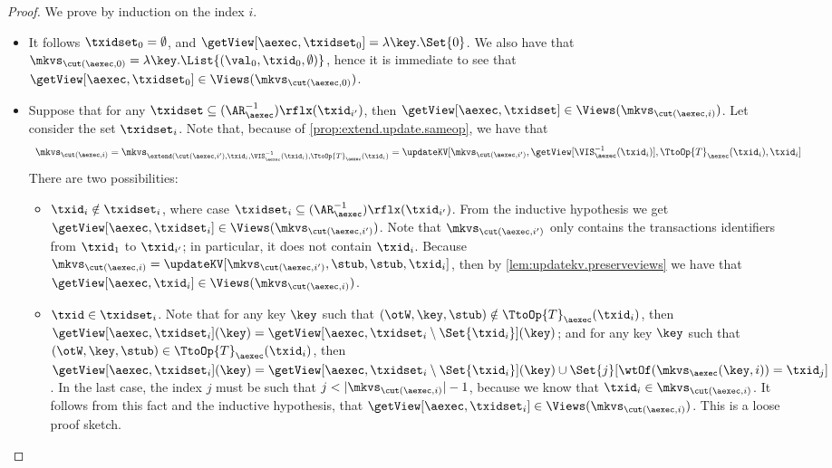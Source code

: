 \begin{proof}
We prove by induction on the index $i$. 
\begin{itemize}
\item {} It follows $\txidset_{0} = \emptyset$, and $\getView[\aexec, \txidset_{0}] = \lambda \key. \Set{0}$. 
We also have that $\mkvs_{\cut(\aexec, 0)} = \lambda \key. \List{(\val_0, \txid_{0}, \emptyset)}$, hence 
it is immediate to see that $\getView[\aexec, \txidset_{0}] \in \Views(\mkvs_{\cut(\aexec, 0)})$.

\item {}
Suppose that for any $\txidset \subseteq (\AR_{\aexec}^{-1})\rflx(\txid_{i'})$, 
then $\getView[\aexec, \txidset] \in \Views(\mkvs_{\cut(\aexec, i)})$. 
Let consider the set $\txidset_{i}$.
Note that, because of \cref{prop:extend.update.sameop}, we have that
\[
\begin{array}{l}
\mkvs_{\cut(\aexec, i)} =
\mkvs_{\extend(\cut(\aexec, i'), \txid_{i}, \VIS^{-1}_{\aexec}(\txid_{i}), \TtoOp{T}_{\aexec}(\txid_{i})} 
= \updateKV[\mkvs_{\cut(\aexec, i')}, \getView[\VIS^{-1}_{\aexec}(\txid_{i})], \TtoOp{T}_{\aexec}(\txid_{i}), \txid_{i}]
\end{array}
\]
There are two possibilities:
\begin{itemize}
\item $\txid_{i} \notin \txidset_{i}$, where case $\txidset_{i} \subseteq (\AR_{\aexec}^{-1})\rflx(\txid_{i'})$.
From the inductive hypothesis we get $\getView[\aexec, \txidset_{i}] \in \Views(\mkvs_{\cut(\aexec, i')})$. 
Note that $\mkvs_{\cut(\aexec, i')}$ only contains the transactions identifiers from $\txid_{1}$ to $\txid_{i'}$;
in particular, it does not contain $\txid_{i}$. 
Because $\mkvs_{\cut(\aexec, i)} = \updateKV[\mkvs_{\cut(\aexec, i')}, \stub, \stub, \txid_{i}]$, 
then by \cref{lem:updatekv.preserveviews} we have that $\getView[\aexec, \txid_{i}] \in \Views(\mkvs_{\cut(\aexec, i)})$.

\item $\txid \in \txidset_{i}$. Note that for any key $\key$ such that 
$(\otW, \key, \stub) \notin \TtoOp{T}_{\aexec}(\txid_{i})$, then 
$\getView[\aexec, \txidset_{i}](\key) = \getView[\aexec, \txidset_{i} \setminus \Set{\txid_{i}}](\key)$; 
and for any key $\key$ such that $(\otW, \key, \stub) \in \TtoOp{T}_{\aexec}(\txid_{i})$, 
then $\getView[\aexec, \txidset_{i}](\key) = \getView[\aexec, \txidset_{i} \setminus \Set{\txid_{i}}](\key) 
\cup \Set{j}[\wtOf(\mkvs_{\aexec}(\key, i)) = \txid_{j}]$. 
In the last case, the index $j$ must be such that $j < \lvert \mkvs_{\cut(\aexec, i)} \rvert - 1$, 
because we know that $\txid_{i} \in \mkvs_{\cut(\aexec, i)}$. 
It follows from this fact and the inductive hypothesis, 
that $\getView[\aexec, \txidset_{i}] \in \Views(\mkvs_{\cut(\aexec, i)})$.
\ac{This is a loose proof sketch.} 
\end{itemize}
\end{itemize}
\end{proof}

